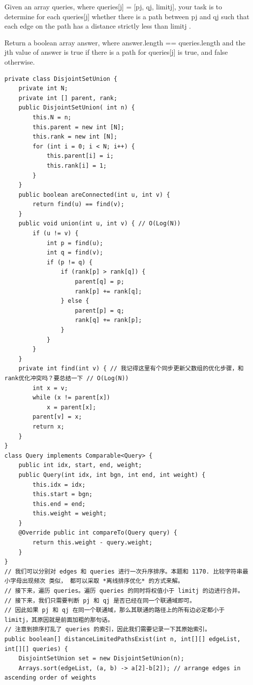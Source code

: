 \documentclass[9pt, b5paaper]{book}
\begin{document}
Given an array queries, where queries[j] = [pj, qj, limitj], your task is to determine for each queries[j] whether there is a path between pj and qj such that each edge on the path has a distance strictly less than limitj .

Return a boolean array answer, where answer.length == queries.length and the jth value of answer is true if there is a path for queries[j] is true, and false otherwise.
\begin{verbatim}
private class DisjointSetUnion {
    private int N;
    private int [] parent, rank;
    public DisjointSetUnion( int n) {
        this.N = n;
        this.parent = new int [N];
        this.rank = new int [N];
        for (int i = 0; i < N; i++) {
            this.parent[i] = i;
            this.rank[i] = 1;
        }
    }
    public boolean areConnected(int u, int v) {
        return find(u) == find(v);
    }
    public void union(int u, int v) { // O(Log(N))
        if (u != v) {
            int p = find(u);
            int q = find(v);
            if (p != q) {
                if (rank[p] > rank[q]) {
                    parent[q] = p;
                    rank[p] += rank[q];
                } else {
                    parent[p] = q;
                    rank[q] += rank[p];
                }
            }
        }
    }
    private int find(int v) { // 我记得这里有个同步更新父数组的优化步骤，和rank优化冲突吗？要总结一下 // O(Log(N))
        int x = v;
        while (x != parent[x])
            x = parent[x];
        parent[v] = x;
        return x;
    }
}
class Query implements Comparable<Query> {
    public int idx, start, end, weight;
    public Query(int idx, int bgn, int end, int weight) {
        this.idx = idx;
        this.start = bgn;
        this.end = end;
        this.weight = weight;
    }
    @Override public int compareTo(Query query) {
        return this.weight - query.weight;
    }
}
// 我们可以分别对 edges 和 queries 进行一次升序排序。本题和 1170. 比较字符串最小字母出现频次 类似， 都可以采取 *离线排序优化* 的方式来解。
// 接下来，遍历 queries。遍历 queries 的同时将权值小于 limitj 的边进行合并。
// 接下来，我们只需要判断 pj 和 qj 是否已经在同一个联通域即可。
// 因此如果 pj 和 qj 在同一个联通域，那么其联通的路径上的所有边必定都小于 limitj，其原因就是前面加粗的那句话。
// 注意到排序打乱了 queries 的索引，因此我们需要记录一下其原始索引。
public boolean[] distanceLimitedPathsExist(int n, int[][] edgeList, int[][] queries) {
    DisjointSetUnion set = new DisjointSetUnion(n);
    Arrays.sort(edgeList, (a, b) -> a[2]-b[2]); // arrange edges in ascending order of weights

\end{verbatim}
\end{document}
